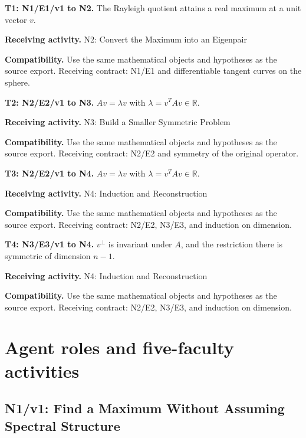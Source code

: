 \documentclass[preprint,12pt,aps,pra,showkeys,amsmath,amssymb,superscriptaddress,floatfix]{revtex4-2}
\theoremstyle{definition}
\theoremstyle{remark}
\newcommand{\field}[2]{\par\smallskip\noindent\textbf{#1.} #2\par}
\begin{document}
\begingroup\small\linespread{1.05}\selectfont

\field{T1: N1/E1/v1 to N2}{The Rayleigh quotient attains a real maximum at a unit vector \(v\).}

\field{Receiving activity}{N2: Convert the Maximum into an Eigenpair}

\field{Compatibility}{Use the same mathematical objects and hypotheses as the source export.
Receiving contract: N1/E1 and differentiable tangent curves on the
sphere.}

\field{T2: N2/E2/v1 to N3}{\(Av=\lambda v\) with \(\lambda=v^TAv\in\mathbb R\).}

\field{Receiving activity}{N3: Build a Smaller Symmetric Problem}

\field{Compatibility}{Use the same mathematical objects and hypotheses as the source export.
Receiving contract: N2/E2 and symmetry of the original operator.}

\field{T3: N2/E2/v1 to N4}{\(Av=\lambda v\) with \(\lambda=v^TAv\in\mathbb R\).}

\field{Receiving activity}{N4: Induction and Reconstruction}

\field{Compatibility}{Use the same mathematical objects and hypotheses as the source export.
Receiving contract: N2/E2, N3/E3, and induction on dimension.}

\field{T4: N3/E3/v1 to N4}{\(v^\perp\) is invariant under \(A\), and the restriction there is
symmetric of dimension \(n-1\).}

\field{Receiving activity}{N4: Induction and Reconstruction}

\field{Compatibility}{Use the same mathematical objects and hypotheses as the source export.
Receiving contract: N2/E2, N3/E3, and induction on dimension.}

\endgroup

\clearpage\section{Agent roles and five-faculty activities}\begingroup\small\linespread{1.05}\selectfont{}

\subsection{N1/v1: Find a Maximum Without Assuming Spectral Structure}
\end{document}
